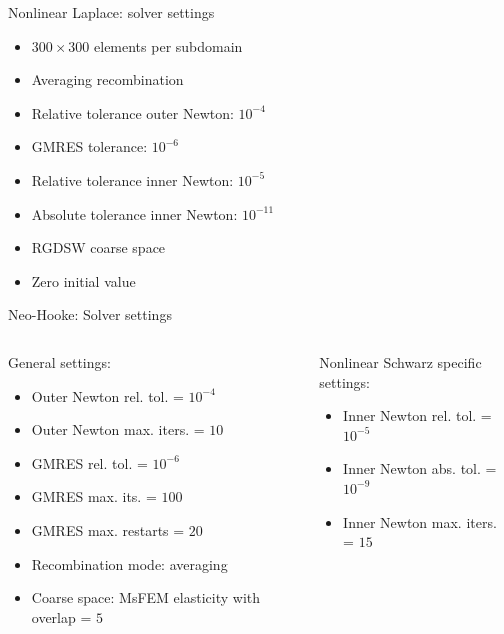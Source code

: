 \begin{frame}[noframenumbering]{Nonlinear Laplace: solver settings}
	\begin{itemize}
		\item $300\times 300$ elements per subdomain
		\item Averaging recombination
		\item Relative tolerance outer Newton: $10^{-4}$
		\item GMRES tolerance: $10^{-6}$
		\item Relative tolerance inner Newton: $10^{-5}$
		\item Absolute tolerance inner Newton: $10^{-11}$
		\item RGDSW coarse space
		\item Zero initial value
	\end{itemize}
\end{frame}

\begin{frame}[noframenumbering]{Neo-Hooke: Solver settings}
	\begin{columns}
		\begin{column}{0.55\textwidth}
			General settings:
			\vspace{7pt}
			\begin{itemize}
				\item Outer Newton rel. tol.  = $10^{-4}$
				\item Outer Newton max. iters. = $10$
				\item GMRES rel. tol. = $10^{-6}$
				\item GMRES max. its. = $100$
				\item GMRES max. restarts = $20$
				\item Recombination mode: averaging
				\item Coarse space: MsFEM elasticity with overlap = $5$
			\end{itemize}
		\end{column}%
		\begin{column}{0.45\textwidth}
			Nonlinear Schwarz specific settings:
			\vspace{7pt}
			\begin{itemize}
				\item Inner Newton rel. tol. = $10^{-5}$
				\item Inner Newton abs. tol. = $10^{-9}$
				\item Inner Newton max. iters. = $15$
			\end{itemize}
		\end{column}
	\end{columns}
\end{frame}

